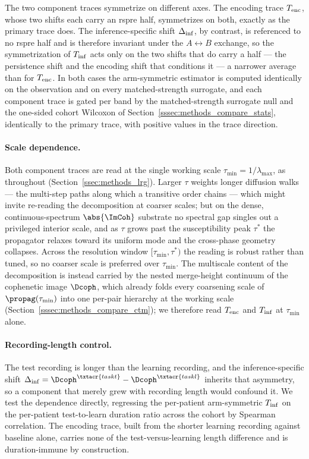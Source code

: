 The two component traces symmetrize on different axes. The encoding trace \(T_{\rm enc}\), whose two shifts each carry an \acrshort{rspre} half, symmetrizes on both, exactly as the primary trace does. The inference-specific shift \(\Delta_{\rm inf}\), by contrast, is referenced to no \acrshort{rspre} half and is therefore invariant under the \(A\!\leftrightarrow\!B\) exchange, so the symmetrization of \(T_{\rm inf}\) acts only on the two shifts that do carry a half --- the persistence shift and the encoding shift that conditions it --- a narrower average than for \(T_{\rm enc}\). In both cases the arm-symmetric estimator is computed identically on the observation and on every matched-strength surrogate, and each component trace is gated per band by the matched-strength surrogate null and the one-sided cohort Wilcoxon of Section~\ref{sssec:methods_compare_stats}, identically to the primary trace, with positive values in the trace direction.

\paragraph{Scale dependence.}
Both component traces are read at the single working scale \(\tau_{\min} = 1/\lambda_{\max}\), as throughout (Section~\ref{ssec:methods_lrg}). Larger \(\tau\) weights longer diffusion walks --- the multi-step paths along which a transitive order chains --- which might invite re-reading the decomposition at coarser scales; but on the dense, continuous-spectrum \(\abs{\ImCoh}\) substrate no spectral gap singles out a privileged interior scale, and as \(\tau\) grows past the susceptibility peak \(\tau^{\ast}\) the propagator relaxes toward its uniform mode and the cross-phase geometry collapses. Across the resolution window \([\tau_{\min}, \tau^{\ast})\) the reading is robust rather than tuned, so no coarser scale is preferred over \(\tau_{\min}\). The multiscale content of the decomposition is instead carried by the nested merge-height continuum of the cophenetic image \(\Dcoph\), which already folds every coarsening scale of \(\propag(\tau_{\min})\) into one per-pair hierarchy at the working scale (Section~\ref{sssec:methods_compare_ctm}); we therefore read \(T_{\rm enc}\) and \(T_{\rm inf}\) at \(\tau_{\min}\) alone.

\paragraph{Recording-length control.}
The test recording is longer than the learning recording, and the inference-specific shift \(\Delta_{\rm inf} = \Dcoph^{\txtacr{taskt}} - \Dcoph^{\txtacr{taskl}}\) inherits that asymmetry, so a component that merely grew with recording length would confound it. We test the dependence directly, regressing the per-patient arm-symmetric \(T_{\rm inf}\) on the per-patient test-to-learn duration ratio across the cohort by Spearman correlation. The encoding trace, built from the shorter learning recording against baseline alone, carries none of the test-versus-learning length difference and is duration-immune by construction.

